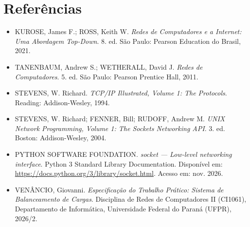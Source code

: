 \section*{Referências}

\begin{itemize}[leftmargin=*]
    \item KUROSE, James F.; ROSS, Keith W. \textit{Redes de Computadores e a Internet: Uma Abordagem Top-Down}. 8. ed. São Paulo: Pearson Education do Brasil, 2021.

    \item TANENBAUM, Andrew S.; WETHERALL, David J. \textit{Redes de Computadores}. 5. ed. São Paulo: Pearson Prentice Hall, 2011.

    \item STEVENS, W. Richard. \textit{TCP/IP Illustrated, Volume 1: The Protocols}. Reading: Addison-Wesley, 1994.

    \item STEVENS, W. Richard; FENNER, Bill; RUDOFF, Andrew M. \textit{UNIX Network Programming, Volume 1: The Sockets Networking API}. 3. ed. Boston: Addison-Wesley, 2004.

    \item PYTHON SOFTWARE FOUNDATION. \textit{socket --- Low-level networking interface}. Python 3 Standard Library Documentation. Disponível em: \url{https://docs.python.org/3/library/socket.html}. Acesso em: nov. 2026.

    \item VENÂNCIO, Giovanni. \textit{Especificação do Trabalho Prático: Sistema de Balanceamento de Cargas}. Disciplina de Redes de Computadores II (CI1061), Departamento de Informática, Universidade Federal do Paraná (UFPR), 2026/2.
\end{itemize}
